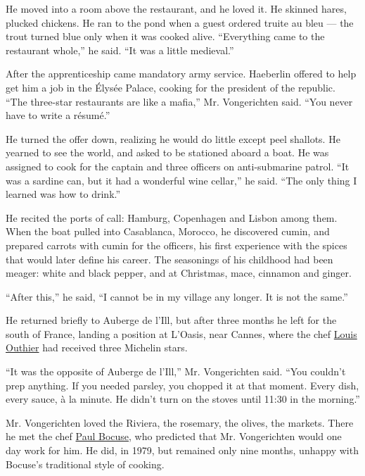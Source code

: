 He moved into a room above the restaurant, and he loved it. He skinned
hares, plucked chickens. He ran to the pond when a guest ordered truite
au bleu --- the trout turned blue only when it was cooked alive.
``Everything came to the restaurant whole,'' he said. ``It was a little
medieval.''

After the apprenticeship came mandatory army service. Haeberlin offered
to help get him a job in the Élysée Palace, cooking for the president of
the republic. ``The three-star restaurants are like a mafia,'' Mr.
Vongerichten said. ``You never have to write a résumé.''

He turned the offer down, realizing he would do little except peel
shallots. He yearned to see the world, and asked to be stationed aboard
a boat. He was assigned to cook for the captain and three officers on
anti-submarine patrol. ``It was a sardine can, but it had a wonderful
wine cellar,'' he said. ``The only thing I learned was how to drink.''

He recited the ports of call: Hamburg, Copenhagen and Lisbon among them.
When the boat pulled into Casablanca, Morocco, he discovered cumin, and
prepared carrots with cumin for the officers, his first experience with
the spices that would later define his career. The seasonings of his
childhood had been meager: white and black pepper, and at Christmas,
mace, cinnamon and ginger.

``After this,'' he said, ``I cannot be in my village any longer. It is
not the same.''

He returned briefly to Auberge de l'Ill, but after three months he left
for the south of France, landing a position at L'Oasis, near Cannes,
where the chef
\href{https://www.nytimes.com/1986/12/24/garden/from-outhier-dishes-with-hint-of-orient.html}{Louis
Outhier} had received three Michelin stars.

``It was the opposite of Auberge de l'Ill,'' Mr. Vongerichten said.
``You couldn't prep anything. If you needed parsley, you chopped it at
that moment. Every dish, every sauce, à la minute. He didn't turn on the
stoves until 11:30 in the morning.''

Mr. Vongerichten loved the Riviera, the rosemary, the olives, the
markets. There he met the chef
\href{https://www.nytimes.com/2018/01/20/obituaries/paul-bocuse-dead.html}{Paul
Bocuse}, who predicted that Mr. Vongerichten would one day work for him.
He did, in 1979, but remained only nine months, unhappy with Bocuse's
traditional style of cooking.

